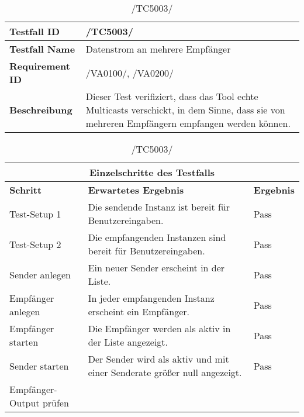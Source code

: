     \begin{table}[h]
        \caption{/TC5003/}
        \label{tab:TC5003}
        \begin{center}
            \begin{tabular}{|p{3.5cm}|p{11cm}|}
                \hline
                    \textbf{Testfall ID} & /TC5003/\\
                \hline
                    \textbf{Testfall Name} & Datenstrom an mehrere Empfänger\\
                \hline
                    \textbf{Requirement ID} & /VA0100/, /VA0200/\\
                \hline
                    \textbf{Beschreibung} & Dieser Test verifiziert, dass das
                    Tool echte Multicasts verschickt, in dem Sinne, dass sie
                    von mehreren Empfängern empfangen werden können.\\
                \hline
            \end{tabular}
            \begin{tabular}{|p{4cm}|p{7.8cm}|p{2.3cm}|}
\multicolumn{3}{|c|}{\textbf{Einzelschritte des Testfalls}} \\
                \hline
                    \textbf{Schritt} & \textbf{Erwartetes Ergebnis} & \textbf{Ergebnis}\\
                \hline
                    Test-Setup 1 &
                    Die sendende Instanz ist bereit für Benutzereingaben. & Pass\\
                \hline
                    Test-Setup 2 & 
                    Die empfangenden Instanzen sind bereit für
                    Benutzereingaben.& Pass\\
                \hline
                    Sender anlegen &
                    Ein neuer Sender erscheint in der Liste.& Pass\\
                \hline
                    Empfänger anlegen &
                    In jeder empfangenden Instanz erscheint ein Empfänger.& Pass\\
                \hline
                    Empfänger starten &
                    Die Empfänger werden als aktiv in der Liste angezeigt.& Pass\\
                \hline
                    Sender starten &
                    Der Sender wird als aktiv und mit einer Senderate größer
                    null angezeigt.& Pass\\
                \hline
                    Empfänger-Output prüfen &

\end{tabular}
\end{center}
\end{table}
